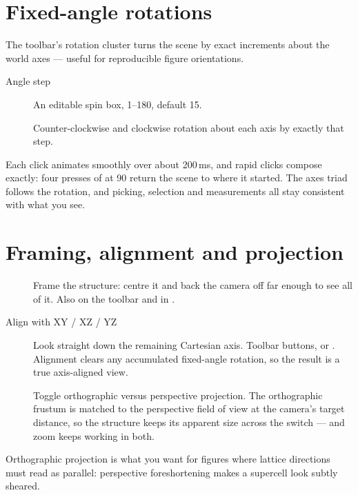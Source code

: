 \section{Fixed-angle rotations}

The toolbar's rotation cluster turns the scene by exact increments about
the world axes --- useful for reproducible figure orientations.

\begin{description}
  \item[Angle step] An editable spin box, 1--180\textdegree, default
    15\textdegree.
  \item[     ]
    Counter-clockwise and clockwise rotation about each axis by exactly
    that step.
\end{description}

Each click animates smoothly over about 200\,ms, and rapid clicks compose
exactly: four presses of  at 90\textdegree{} return the scene to
where it started. The axes triad follows the rotation, and picking,
selection and measurements all stay consistent with what you see.

\section{Framing, alignment and projection}

\begin{description}
  \item[] Frame the structure: centre it and back the camera off far
    enough to see all of it. Also on the toolbar and in
    \menusep{}.
  \item[Align with XY / XZ / YZ] Look straight down the remaining
    Cartesian axis. Toolbar buttons, or
    \menusep{}. Alignment clears any accumulated
    fixed-angle rotation, so the result is a true axis-aligned view.
  \item[] Toggle orthographic versus perspective projection. The
    orthographic frustum is matched to the perspective field of view at the
    camera's target distance, so the structure keeps its apparent size
    across the switch --- and zoom keeps working in both.
\end{description}

\begin{caltip}
Orthographic projection is what you want for figures where lattice
directions must read as parallel: perspective foreshortening makes a
supercell look subtly sheared.
\end{caltip}

